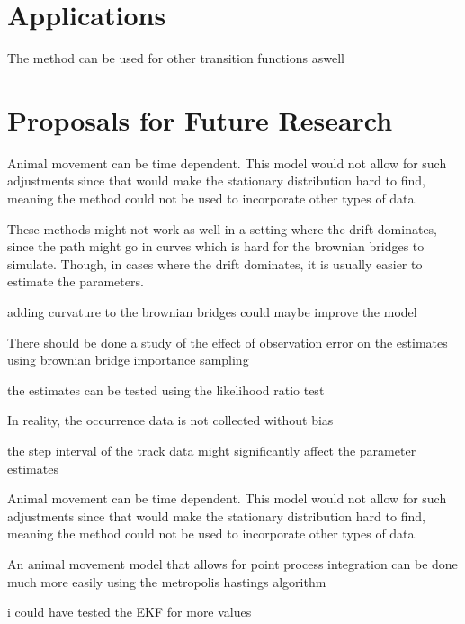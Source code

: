 \section{Applications}
The method can be used for other transition functions aswell







\section{Proposals for Future Research}




Animal movement can be time dependent. This model would not allow for such adjustments since that would make the stationary distribution hard to find, meaning the method could not be used to incorporate other types of data.



These methods might not work as well in a setting where the drift dominates, since the path might go in curves which is hard for the brownian bridges to simulate. Though, in cases where the drift dominates, it is usually easier to estimate the parameters.


adding curvature to the brownian bridges could maybe improve the model


There should be done a study of the effect of observation error on the estimates using brownian bridge importance sampling

the estimates can be tested using the likelihood ratio test


In reality, the occurrence data is not collected without bias

the step interval of the track data might significantly affect the parameter estimates

Animal movement can be time dependent. This model would not allow for such adjustments since that would make the stationary distribution hard to find, meaning the method could not be used to incorporate other types of data.

An animal movement model that allows for point process integration can be done much more easily using the metropolis hastings algorithm

i could have tested the EKF for more values